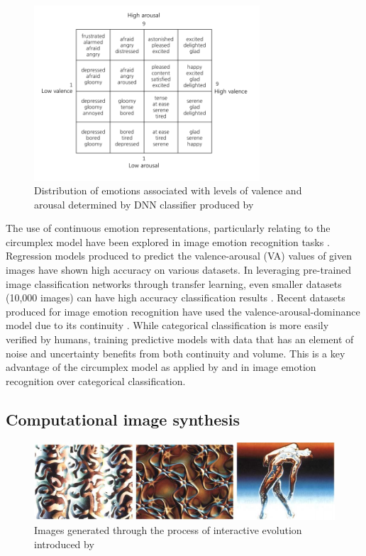 \documentclass{article}
\begin{document}
\begin{figure}[h!]
	\centering
	\includegraphics[width=0.75\textwidth]{images/valence-arousal-grid.png}
	\caption{Distribution of emotions associated with levels of valence and arousal determined by DNN classifier produced by \citet{kim2018building}}
	\label{fig:valence-arousal}
\end{figure}

The use of continuous emotion representations, particularly relating to the circumplex model have been explored in image emotion recognition tasks \citep{kim2018building, zhao2016predicting, zhao2017continuous}.
Regression models produced to predict the valence-arousal (VA) values of given images have shown high accuracy on various datasets.
In leveraging pre-trained image classification networks through transfer learning, even smaller datasets (10,000 images) can have high accuracy classification results \citep{kim2018building}.
Recent datasets produced for image emotion recognition have used the valence-arousal-dominance model due to its continuity \citep{zhao2016predicting}.
While categorical classification is more easily verified by humans, training predictive models with data that has an element of noise and uncertainty benefits from both continuity and volume.
This is a key advantage of the circumplex model as applied by \citet{kim2018building} and \citet{zhao2016predicting} in image emotion recognition over categorical classification.


\subsection{Computational image synthesis}

\begin{figure}[h!]
	\includegraphics[width=\textwidth]{images/sims-interactive-image-generation.png}
	\caption{Images generated through the process of interactive evolution introduced by \citet{sims}}
	\label{fig:sims}
\end{figure}
\end{document}
